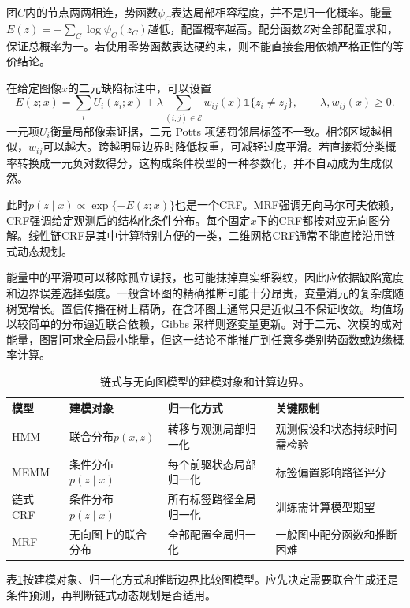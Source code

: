 团$C$内的节点两两相连，势函数$\psi_C$表达局部相容程度，并不是归一化概率。能量$E(z)=-\sum_C\log\psi_C(z_C)$越低，配置概率越高。配分函数$Z$对全部配置求和，保证总概率为一。若使用零势函数表达硬约束，则不能直接套用依赖严格正性的等价结论。

在给定图像$x$的二元缺陷标注中，可以设置
\begin{equation}
 E(z;x)=\sum_i U_i(z_i;x)+\lambda\sum_{(i,j)\in\mathcal E}
 w_{ij}(x)\mathbb 1\{z_i\ne z_j\},\qquad \lambda,w_{ij}(x)\geq0.
\end{equation}
一元项$U_i$衡量局部像素证据，二元 Potts 项惩罚邻居标签不一致。相邻区域越相似，$w_{ij}$可以越大。跨越明显边界时降低权重，可减轻过度平滑。若直接将分类概率转换成一元负对数得分，这构成条件模型的一种参数化，并不自动成为生成似然。

此时$p(z\mid x)\propto\exp\{-E(z;x)\}$也是一个CRF。MRF强调无向马尔可夫依赖，CRF强调给定观测后的结构化条件分布。每个固定$x$下的CRF都按对应无向图分解。线性链CRF是其中计算特别方便的一类，二维网格CRF通常不能直接沿用链式动态规划。

能量中的平滑项可以移除孤立误报，也可能抹掉真实细裂纹，因此应依据缺陷宽度和边界误差选择强度。一般含环图的精确推断可能十分昂贵，变量消元的复杂度随树宽增长。置信传播在树上精确，在含环图上通常只是近似且不保证收敛。均值场以较简单的分布逼近联合依赖，Gibbs 采样则逐变量更新。对于二元、次模的成对能量，图割可求全局最小能量，但这一结论不能推广到任意多类别势函数或边缘概率计算。

\begin{table}[htbp]
\centering
\caption{链式与无向图模型的建模对象和计算边界。}
\label{tab:bayes-graph-models}
\small
\begin{tabular}{m{1.2cm}m{2.7cm}m{3cm}m{3.6cm}}
\hline
模型 & 建模对象 & 归一化方式 & 关键限制 \\
\hline
HMM & 联合分布$p(x,z)$ & 转移与观测局部归一化 & 观测假设和状态持续时间需检验 \\
MEMM & 条件分布$p(z\mid x)$ & 每个前驱状态局部归一化 & 标签偏置影响路径评分 \\
链式 CRF & 条件分布$p(z\mid x)$ & 所有标签路径全局归一化 & 训练需计算模型期望 \\
MRF & 无向图上的联合分布 & 全部配置全局归一化 & 一般图中配分函数和推断困难 \\
\hline
\end{tabular}
\end{table}

表\ref{tab:bayes-graph-models}按建模对象、归一化方式和推断边界比较图模型。应先决定需要联合生成还是条件预测，再判断链式动态规划是否适用。

